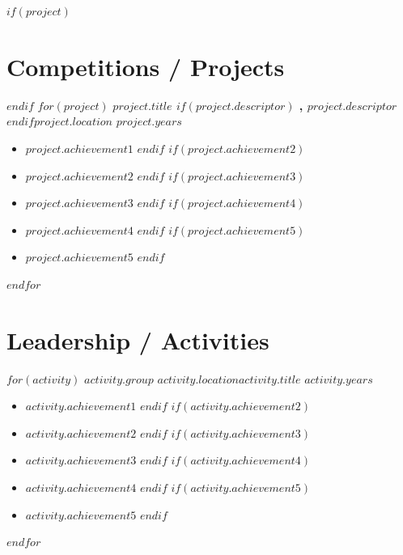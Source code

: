 \documentclass[11pt]{cv-class}
\begin{document}
$if(project)$ \section{Competitions / Projects} $endif$
$for(project)$
    \noindent\textbf{$project.title$ $if(project.descriptor)$ \unskip, \textit{$project.descriptor$} $endif$}\quad \textit{$project.location$} \hfill {$project.years$}
    \begin{itemize}[noitemsep,nolistsep,leftmargin=*]
        $if(project.achievement1)$ \item \raggedright{$project.achievement1$} $endif$
        $if(project.achievement2)$ \item \raggedright{$project.achievement2$} $endif$
        $if(project.achievement3)$ \item \raggedright{$project.achievement3$} $endif$
        $if(project.achievement4)$ \item \raggedright{$project.achievement4$} $endif$
        $if(project.achievement5)$ \item \raggedright{$project.achievement5$} $endif$
    \end{itemize}
    \bigskip
$endfor$

\section{Leadership / Activities}
$for(activity)$
    \noindent\textbf{$activity.group$} \hfill {$activity.location$}\break\textit{$activity.title$} \hfill {$activity.years$}
    \begin{itemize}[noitemsep,nolistsep,leftmargin=*]
        $if(activity.achievement1)$ \item \raggedright{$activity.achievement1$} $endif$
        $if(activity.achievement2)$ \item \raggedright{$activity.achievement2$} $endif$
        $if(activity.achievement3)$ \item \raggedright{$activity.achievement3$} $endif$
        $if(activity.achievement4)$ \item \raggedright{$activity.achievement4$} $endif$
        $if(activity.achievement5)$ \item \raggedright{$activity.achievement5$} $endif$
    \end{itemize}
    \bigskip
$endfor$
\end{document}
